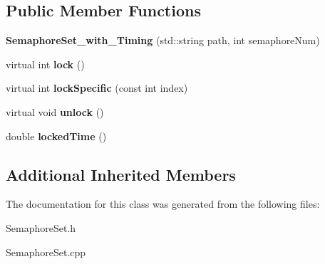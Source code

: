 \subsection*{Public Member Functions}
\begin{DoxyCompactItemize}
\item 
{\bfseries Semaphore\+Set\+\_\+with\+\_\+\+Timing} (std\+::string path, int semaphore\+Num)\hypertarget{classSemaphoreSet__with__Timing_ab9ab6cf0bdb9385be18444db84611378}{}\label{classSemaphoreSet__with__Timing_ab9ab6cf0bdb9385be18444db84611378}

\item 
virtual int {\bfseries lock} ()\hypertarget{classSemaphoreSet__with__Timing_ad0094fa75fbc904182db64452bc6d5bb}{}\label{classSemaphoreSet__with__Timing_ad0094fa75fbc904182db64452bc6d5bb}

\item 
virtual int {\bfseries lock\+Specific} (const int index)\hypertarget{classSemaphoreSet__with__Timing_a6905ecc96bb6a7cc3ecb439624adfa04}{}\label{classSemaphoreSet__with__Timing_a6905ecc96bb6a7cc3ecb439624adfa04}

\item 
virtual void {\bfseries unlock} ()\hypertarget{classSemaphoreSet__with__Timing_ae47a0e2807c8adfb1a8c1dd03ecb7771}{}\label{classSemaphoreSet__with__Timing_ae47a0e2807c8adfb1a8c1dd03ecb7771}

\item 
double {\bfseries locked\+Time} ()\hypertarget{classSemaphoreSet__with__Timing_a4254bbd58032a3f60d7590c834ba1843}{}\label{classSemaphoreSet__with__Timing_a4254bbd58032a3f60d7590c834ba1843}

\end{DoxyCompactItemize}
\subsection*{Additional Inherited Members}


The documentation for this class was generated from the following files\+:\begin{DoxyCompactItemize}
\item 
Semaphore\+Set.\+h\item 
Semaphore\+Set.\+cpp\end{DoxyCompactItemize}
